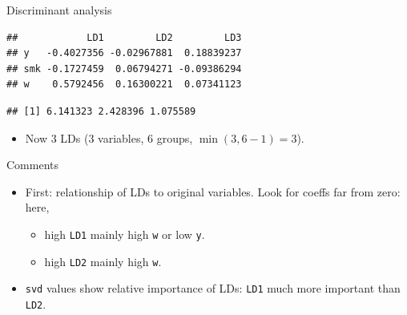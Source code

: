 \documentclass[
  ignorenonframetext,
]{beamer}
\newenvironment{Shaded}{\begin{snugshade}}{\end{snugshade}}
\newcommand{\DataTypeTok}[1]{\textcolor[rgb]{0.13,0.29,0.53}{#1}}
\newcommand{\FloatTok}[1]{\textcolor[rgb]{0.00,0.00,0.81}{#1}}
\newcommand{\KeywordTok}[1]{\textcolor[rgb]{0.13,0.29,0.53}{\textbf{#1}}}
\newcommand{\NormalTok}[1]{#1}
\newcommand{\OperatorTok}[1]{\textcolor[rgb]{0.81,0.36,0.00}{\textbf{#1}}}
\newcommand{\StringTok}[1]{\textcolor[rgb]{0.31,0.60,0.02}{#1}}
\providecommand{\tightlist}{%
  \setlength{\itemsep}{0pt}\setlength{\parskip}{0pt}}
\begin{document}
\begin{frame}[fragile]{Discriminant analysis}
\protect\hypertarget{discriminant-analysis-2}{}

\small

\begin{Shaded}
\end{Shaded}

\begin{verbatim}
##            LD1         LD2         LD3
## y   -0.4027356 -0.02967881  0.18839237
## smk -0.1727459  0.06794271 -0.09386294
## w    0.5792456  0.16300221  0.07341123
\end{verbatim}

\begin{Shaded}
\end{Shaded}

\begin{verbatim}
## [1] 6.141323 2.428396 1.075589
\end{verbatim}

\normalsize

\begin{itemize}
\tightlist
\item
  Now 3 LDs (3 variables, 6 groups, \(\min(3,6-1)=3\)).
\end{itemize}

\end{frame}

\begin{frame}[fragile]{Comments}
\protect\hypertarget{comments-25}{}

\begin{itemize}
\item
  First: relationship of LDs to original variables. Look for coeffs far
  from zero: here,

  \begin{itemize}
  \item
    high \texttt{LD1} mainly high \texttt{w} or low \texttt{y}.
  \item
    high \texttt{LD2} mainly high \texttt{w}.
  \end{itemize}
\item
  \texttt{svd} values show relative importance of LDs: \texttt{LD1} much
  more important than \texttt{LD2}.
\end{itemize}

\end{frame}
\end{document}
